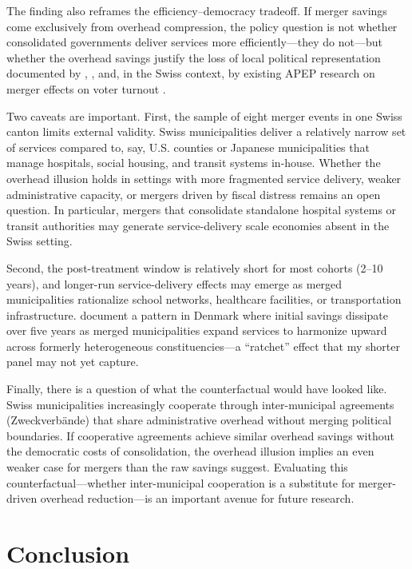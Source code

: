 \documentclass[12pt]{article}
\begin{document}
The finding also reframes the efficiency--democracy tradeoff. If merger savings come exclusively from overhead compression, the policy question is not whether consolidated governments deliver services more efficiently---they do not---but whether the overhead savings justify the loss of local political representation documented by \citet{lassen2006}, \citet{koch2013}, and, in the Swiss context, by existing APEP research on merger effects on voter turnout \citep{apep_merger_democracy}.

Two caveats are important. First, the sample of eight merger events in one Swiss canton limits external validity. Swiss municipalities deliver a relatively narrow set of services compared to, say, U.S. counties or Japanese municipalities that manage hospitals, social housing, and transit systems in-house. Whether the overhead illusion holds in settings with more fragmented service delivery, weaker administrative capacity, or mergers driven by fiscal distress remains an open question. In particular, mergers that consolidate standalone hospital systems or transit authorities may generate service-delivery scale economies absent in the Swiss setting.

Second, the post-treatment window is relatively short for most cohorts (2--10 years), and longer-run service-delivery effects may emerge as merged municipalities rationalize school networks, healthcare facilities, or transportation infrastructure. \citet{blom-hansen2016} document a pattern in Denmark where initial savings dissipate over five years as merged municipalities expand services to harmonize upward across formerly heterogeneous constituencies---a ``ratchet'' effect that my shorter panel may not yet capture.

Finally, there is a question of what the counterfactual would have looked like. Swiss municipalities increasingly cooperate through inter-municipal agreements (Zweckverbände) that share administrative overhead without merging political boundaries. If cooperative agreements achieve similar overhead savings without the democratic costs of consolidation, the overhead illusion implies an even weaker case for mergers than the raw savings suggest. Evaluating this counterfactual---whether inter-municipal cooperation is a substitute for merger-driven overhead reduction---is an important avenue for future research.

\section{Conclusion}
\end{document}
